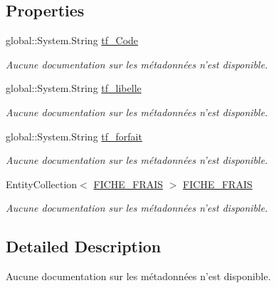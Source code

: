 \subsection*{Properties}
\begin{DoxyCompactItemize}
\item 
global\-::\-System.\-String \hyperlink{class_model_1_1_t_y_p_e___f_r_a_i_s_ac8c5a8aeabcb4b38a50db20d886ecb9e}{tf\-\_\-\-Code}
\begin{DoxyCompactList}\small\item\em Aucune documentation sur les métadonnées n'est disponible. \end{DoxyCompactList}\item 
global\-::\-System.\-String \hyperlink{class_model_1_1_t_y_p_e___f_r_a_i_s_af00f4a0d82dbf74a04003222679a055a}{tf\-\_\-libelle}
\begin{DoxyCompactList}\small\item\em Aucune documentation sur les métadonnées n'est disponible. \end{DoxyCompactList}\item 
global\-::\-System.\-String \hyperlink{class_model_1_1_t_y_p_e___f_r_a_i_s_a6ae5651634f9c6cea6689957657159fb}{tf\-\_\-forfait}
\begin{DoxyCompactList}\small\item\em Aucune documentation sur les métadonnées n'est disponible. \end{DoxyCompactList}\item 
Entity\-Collection$<$ \hyperlink{class_model_1_1_f_i_c_h_e___f_r_a_i_s}{F\-I\-C\-H\-E\-\_\-\-F\-R\-A\-I\-S} $>$ \hyperlink{class_model_1_1_t_y_p_e___f_r_a_i_s_ac73991c83b4b4897ea4ebcb2a7c5dc19}{F\-I\-C\-H\-E\-\_\-\-F\-R\-A\-I\-S}
\begin{DoxyCompactList}\small\item\em Aucune documentation sur les métadonnées n'est disponible. \end{DoxyCompactList}\end{DoxyCompactItemize}


\subsection{Detailed Description}
Aucune documentation sur les métadonnées n'est disponible. 



